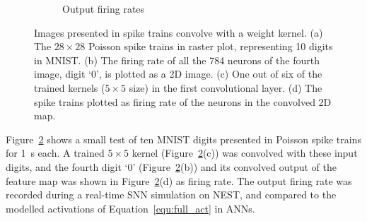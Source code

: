 \begin{figure}[tbh!]
\begin{subfigure}[t]{0.3\textwidth}
			\caption{Output firing rates}
			\label{Fig:64}
		\end{subfigure}
		\caption{Images presented in spike trains convolve with a weight kernel. (a) The $28\times28$ Poisson spike trains in raster plot, representing 10 digits in MNIST. (b) The firing rate of all the 784 neurons of the fourth image, digit `0', is plotted as a 2D image.
		(c) One out of six of the trained kernels ($5\times5$ size) in the first convolutional layer.
		(d) The spike trains plotted as firing rate of the neurons in the convolved 2D map.}
		\label{fig:cnn}
	\end{figure}

	Figure~\ref{fig:cnn} shows a small test of ten MNIST digits presented in Poisson spike trains for 1~s each.
	A trained $5\times5$ kernel (Figure~\ref{fig:cnn}(c)) was convolved with these input digits, and the fourth digit `0' (Figure~\ref{fig:cnn}(b)) and its convolved output of the feature map was shown in Figure~\ref{fig:cnn}(d) as firing rate.
	The output firing rate was recorded during a real-time SNN simulation on NEST, and compared to the modelled activations of Equation~\ref{equ:full_act} in ANNs.
	
